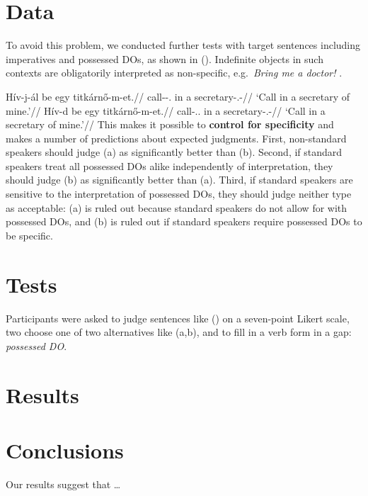 \section{Data} To avoid this problem, we conducted further tests with target
sentences including imperatives and possessed DOs, as shown in (\nextx).
Indefinite objects in such contexts are obligatorily interpreted as
non-specific, e.g.\ \emph{Bring me a doctor!} \parencite[154]{Abbott2010}.

\pex
    \a
    \begingl{}
        \gla    Hív-j-ál be egy titkárnő-m-et.//
        \glb    call-\Imp-\Ssg.\Sbj{} in a secretary-\Poss.\Fsg-\Acc{}//
        \glft   `Call in a secretary of mine.'//
    \endgl
    \a
    \begingl{}
        \gla    Hív-d be egy titkárnő-m-et.//
        \glb    call-\Imp.\Ssg.\Obj{} in a secretary-\Poss.\Fsg-\Acc{}//
        \glft   `Call in a secretary of mine.'//
    \endgl
\xe
This makes it possible to \textbf{control for specificity} and makes a number
of predictions about expected judgments. First, non-standard speakers should
judge (\lastx a) as significantly better than (\lastx b). Second, if standard
speakers treat all possessed DOs alike independently of interpretation, they
should judge (\lastx b) as significantly better than (\lastx a). Third, if
standard speakers are sensitive to the interpretation of possessed DOs, they
should judge neither type as acceptable: (\lastx a) is ruled out because
standard speakers do not allow for \Sbj{} with possessed DOs, and (\lastx b) is
ruled out if standard speakers require possessed DOs to be specific.

\section{Tests} Participants were asked to judge sentences like (\lastx) on a
seven-point Likert scale, two choose one of two alternatives like (\lastx a,b),
and to fill in a verb form in a gap: \underline{\hphantom{2em}} \emph{possessed
    DO}.

\section{Results}

\section{Conclusions} Our results suggest that \ldots{}

\newrefcontext[sorting=nyt]
\printbibliography


